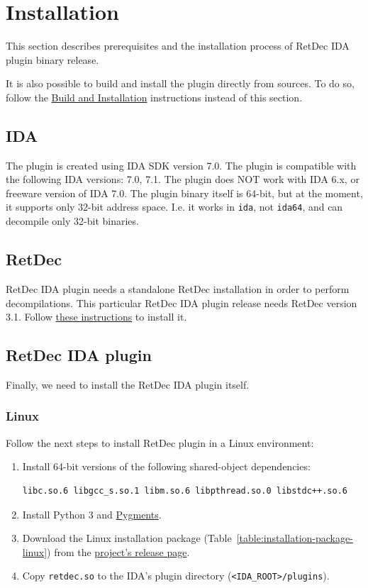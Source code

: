 \documentclass[pdftex, a4paper,12pt, oneside, svgnames]{article}
\begin{document}
\section{Installation}
\label{sec:installation}
This section describes prerequisites and the installation process of RetDec IDA plugin binary release.

It is also possible to build and install the plugin directly from sources. To do so, follow the \href{https://github.com/avast-tl/retdec-idaplugin#build-and-installation}{Build and Installation} instructions instead of this section.

\subsection{IDA}
The plugin is created using IDA SDK version 7.0. The plugin is compatible with the following IDA versions: 7.0, 7.1. The plugin does NOT work with IDA 6.x, or freeware version of IDA 7.0. The plugin binary itself is 64-bit, but at the moment, it supports only 32-bit address space. I.e. it works in \texttt{ida}, not \texttt{ida64}, and can decompile only 32-bit binaries.

\subsection{RetDec}
\label{sec:installation:retdec}
RetDec IDA plugin needs a standalone RetDec installation in order to perform decompilations. This particular RetDec IDA plugin release needs RetDec version 3.1. Follow \href{https://github.com/avast-tl/retdec/blob/3eaa0eaf9b27bee605786702784c4a1cecea3bc6/README.md#installation-and-use}{these instructions} to install it.

\subsection{RetDec IDA plugin}
Finally, we need to install the RetDec IDA plugin itself.

\subsubsection{Linux}
Follow the next steps to install RetDec plugin in a Linux environment:
\begin{enumerate}
	\item Install 64-bit versions of the following shared-object dependencies:
\begin{verbatim}
libc.so.6 libgcc_s.so.1 libm.so.6 libpthread.so.0 libstdc++.so.6
\end{verbatim}
	\item Install Python 3 and \href{http://pygments.org/}{Pygments}.
	\item Download the Linux installation package (Table~\ref{table:installation-package-linux}) from the \href{https://github.com/avast-tl/retdec-idaplugin/releases}{project's release page}.
	\item Copy \texttt{retdec.so} to the IDA's plugin directory (\texttt{<IDA\_ROOT>/plugins}).
\end{enumerate}
\end{document}
